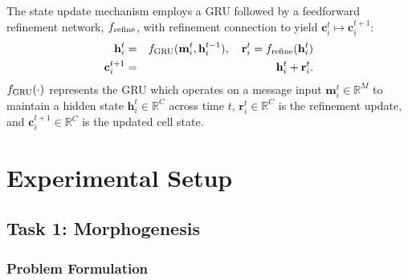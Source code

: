 \documentclass[letterpaper]{article}
\newcommand{\bh}[1]{{\color{black}#1}}  %
\begin{document}
\bh{
The state update mechanism employs a GRU followed by a feedforward refinement network, $f_{\textnormal{refine}}$, with refinement connection to yield $\mathbf{c}_i^{t}\mapsto\mathbf{c}_i^{t+1}$:
\begin{eqnarray}
    \mathbf{h}_i^t &=& f_{\textnormal{GRU}}(\mathbf{m}_i^t, \mathbf{h}_i^{t-1}),\quad
    \mathbf{r}_i^t = f_{\textnormal{refine}}(\mathbf{h}_i^t)\\
    \mathbf{c}_i^{t+1} &=& \mathbf{h}_i^t + \mathbf{r}_i^t.
    \label{eq:state:update:GRU}
\end{eqnarray}
$f_{\textnormal{GRU}}(\cdot)$ represents the GRU which operates on a message input $\mathbf{m}_i^t\in\mathbb{R}^M$ to maintain a hidden state $\mathbf{h}_i^t\in\mathbb{R}^C$ across time $t$, $\mathbf{r}_i^t\in\mathbb{R}^C$ is the refinement update, and $\mathbf{c}_i^{t+1}\in\mathbb{R}^C$ is the updated cell state.
}


\section{\bh{Experimental Setup}}
\subsection{Task 1: Morphogenesis}

\subsubsection{Problem Formulation}
\end{document}
